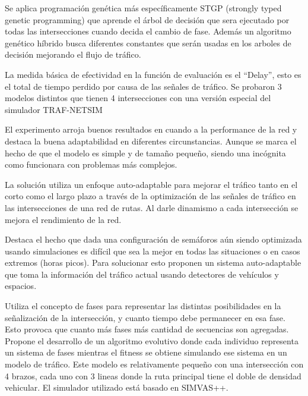 \begin{itemize}
\begin{item}
		Se aplica programación genética más específicamente STGP (strongly typed genetic programming) \citep{Montana1995} que aprende el árbol de decisión que sera ejecutado por todas las intersecciones cuando decida el cambio de fase. Además un algoritmo genético híbrido busca diferentes constantes que serán usadas en los arboles de decisión mejorando el flujo de tráfico.
		
		La medida básica de efectividad en la función de evaluación es el “Delay”, esto es el total de tiempo perdido por causa de las señales de tráfico. Se probaron 3 modelos distintos que tienen 4 intersecciones con una versión especial del simulador  TRAF-NETSIM \citep{TRAF-NETSIM}
		
		El experimento arroja buenos resultados en cuando a la performance de la red y destaca la buena adaptabilidad en diferentes circunstancias. Aunque se marca el hecho de que el modelo es simple y de tamaño pequeño, siendo una incógnita como funcionara con problemas más complejos.
		
	\end{item}	
	
	
	\begin{item}
		
		La solución utiliza un enfoque auto-adaptable para mejorar el tráfico tanto en el corto como el largo plazo a través de la optimización de las señales de tráfico en las intersecciones de una red de rutas. Al darle dinamismo a cada intersección se mejora el rendimiento de la red.
		
		Destaca el hecho que dada una configuración de semáforos aún siendo optimizada usando simulaciones es difícil que sea la mejor en todas las situaciones o en casos extremos (horas picos). Para solucionar esto proponen un sistema auto-adaptable que toma la información del tráfico actual usando detectores de vehículos y espacios.
		
		Utiliza el concepto de fases para representar las distintas posibilidades en la señalización de la intersección, y cuanto tiempo debe permanecer en esa fase. Esto provoca que cuanto más fases más cantidad de secuencias son agregadas.
		Propone el desarrollo de un algoritmo evolutivo donde cada individuo representa un sistema de fases mientras el fitness se obtiene simulando ese sistema en un modelo de tráfico. Este modelo es relativamente pequeño con una intersección con 4 brazos, cada uno con 3 lineas donde la ruta principal tiene el doble de densidad vehicular. El simulador utilizado está basado en SIMVAS++.
		

\end{item}
\end{itemize}

